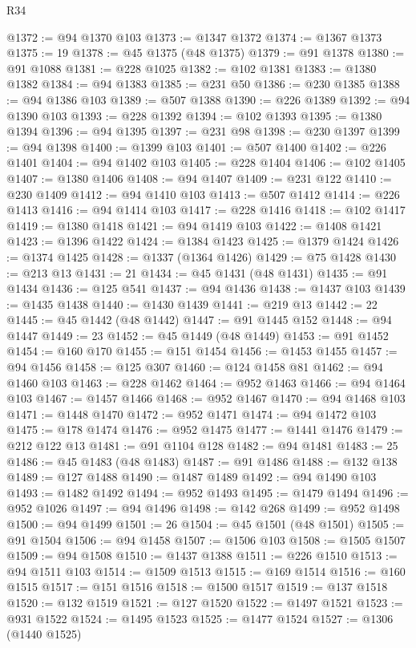 \begin{lexlean}{R34}
\begin{coremodule}
@1372 := @94 @1370 @103
@1373 := @1347 @1372
@1374 := @1367 @1373
@1375 := 19
@1378 := @45 @1375 (@48 @1375)
@1379 := @91 @1378
@1380 := @91 @1088
@1381 := @228 @1025
@1382 := @102 @1381
@1383 := @1380 @1382
@1384 := @94 @1383
@1385 := @231 @50
@1386 := @230 @1385
@1388 := @94 @1386 @103
@1389 := @507 @1388
@1390 := @226 @1389
@1392 := @94 @1390 @103
@1393 := @228 @1392
@1394 := @102 @1393
@1395 := @1380 @1394
@1396 := @94 @1395
@1397 := @231 @98
@1398 := @230 @1397
@1399 := @94 @1398
@1400 := @1399 @103
@1401 := @507 @1400
@1402 := @226 @1401
@1404 := @94 @1402 @103
@1405 := @228 @1404
@1406 := @102 @1405
@1407 := @1380 @1406
@1408 := @94 @1407
@1409 := @231 @122
@1410 := @230 @1409
@1412 := @94 @1410 @103
@1413 := @507 @1412
@1414 := @226 @1413
@1416 := @94 @1414 @103
@1417 := @228 @1416
@1418 := @102 @1417
@1419 := @1380 @1418
@1421 := @94 @1419 @103
@1422 := @1408 @1421
@1423 := @1396 @1422
@1424 := @1384 @1423
@1425 := @1379 @1424
@1426 := @1374 @1425
@1428 := @1337 (@1364 @1426)
@1429 := @75 @1428
@1430 := @213 @13
@1431 := 21
@1434 := @45 @1431 (@48 @1431)
@1435 := @91 @1434
@1436 := @125 @541
@1437 := @94 @1436
@1438 := @1437 @103
@1439 := @1435 @1438
@1440 := @1430 @1439
@1441 := @219 @13
@1442 := 22
@1445 := @45 @1442 (@48 @1442)
@1447 := @91 @1445 @152
@1448 := @94 @1447
@1449 := 23
@1452 := @45 @1449 (@48 @1449)
@1453 := @91 @1452
@1454 := @160 @170
@1455 := @151 @1454
@1456 := @1453 @1455
@1457 := @94 @1456
@1458 := @125 @307
@1460 := @124 @1458 @81
@1462 := @94 @1460 @103
@1463 := @228 @1462
@1464 := @952 @1463
@1466 := @94 @1464 @103
@1467 := @1457 @1466
@1468 := @952 @1467
@1470 := @94 @1468 @103
@1471 := @1448 @1470
@1472 := @952 @1471
@1474 := @94 @1472 @103
@1475 := @178 @1474
@1476 := @952 @1475
@1477 := @1441 @1476
@1479 := @212 @122 @13
@1481 := @91 @1104 @128
@1482 := @94 @1481
@1483 := 25
@1486 := @45 @1483 (@48 @1483)
@1487 := @91 @1486
@1488 := @132 @138
@1489 := @127 @1488
@1490 := @1487 @1489
@1492 := @94 @1490 @103
@1493 := @1482 @1492
@1494 := @952 @1493
@1495 := @1479 @1494
@1496 := @952 @1026
@1497 := @94 @1496
@1498 := @142 @268
@1499 := @952 @1498
@1500 := @94 @1499
@1501 := 26
@1504 := @45 @1501 (@48 @1501)
@1505 := @91 @1504
@1506 := @94 @1458
@1507 := @1506 @103
@1508 := @1505 @1507
@1509 := @94 @1508
@1510 := @1437 @1388
@1511 := @226 @1510
@1513 := @94 @1511 @103
@1514 := @1509 @1513
@1515 := @169 @1514
@1516 := @160 @1515
@1517 := @151 @1516
@1518 := @1500 @1517
@1519 := @137 @1518
@1520 := @132 @1519
@1521 := @127 @1520
@1522 := @1497 @1521
@1523 := @931 @1522
@1524 := @1495 @1523
@1525 := @1477 @1524
@1527 := @1306 (@1440 @1525)

\end{coremodule}
\end{lexlean}
